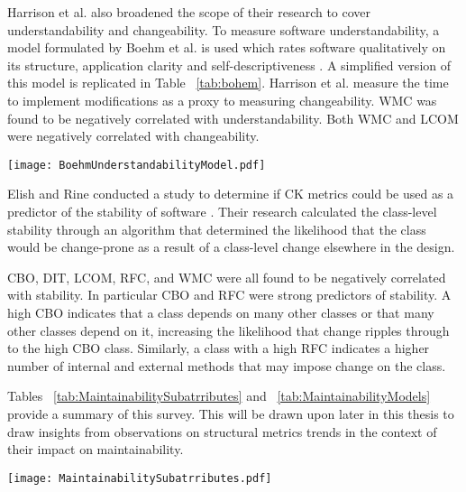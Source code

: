 Harrison et al. also broadened the scope of their research to cover understandability and changeability. To measure software understandability, a model formulated by Boehm et al. is used which rates software qualitatively on its structure, application clarity and self-descriptiveness \citep{boehm1978characteristics}. A simplified version of this model is replicated in Table ~\ref{tab:bohem}. Harrison et al. measure the time to implement modifications as a proxy to measuring changeability. WMC was found to be negatively correlated with understandability. Both WMC and LCOM were negatively correlated with changeability.

\begin{table}
\begin{tabular}
 \centering 
 \texttt{[image: BoehmUnderstandabilityModel.pdf]}
 \label{tab:bohem}
\end{tabular}
\end{table}

Elish and Rine conducted a study to determine if CK metrics could be used as a predictor of the stability of software \citep{elish2003investigation}. Their research calculated the class-level stability through an algorithm that determined the likelihood that the class would be change-prone as a result of a class-level change elsewhere in the design. 

CBO, DIT, LCOM, RFC, and WMC were all found to be negatively correlated with stability. In particular CBO and RFC were strong predictors of stability. A high CBO indicates that a class depends on many other classes or that many other classes depend on it, increasing the likelihood that change ripples through to the high CBO class. Similarly, a class with a high RFC indicates a higher number of internal and external methods that may impose change on the class. 

Tables ~\ref{tab:MaintainabilitySubatrributes} and  ~\ref{tab:MaintainabilityModels} provide a summary of this survey. This will be drawn upon later in this thesis to draw insights from observations on structural metrics trends in the context of their impact on maintainability.

\begin{table}
\begin{tabular}
\centering 
\texttt{[image: MaintainabilitySubatrributes.pdf]}
\label{tab:MaintainabilitySubatrributes}
\end{tabular}
\end{table}

